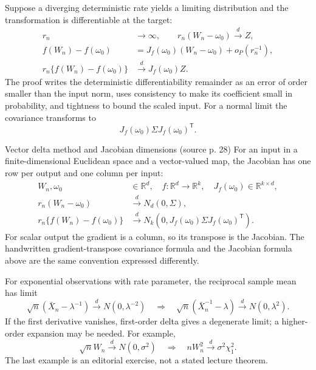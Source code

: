 \documentclass[12pt]{article}
\newcommand{\R}{\mathbb R}
\begin{document}
Suppose a diverging deterministic rate yields a limiting distribution and
the transformation is differentiable at the target:
\begin{align}
 r_n&\to\infty,\qquad r_n(W_n-\omega_0)\xrightarrow{d}Z,\\
 f(W_n)-f(\omega_0)&=J_f(\omega_0)(W_n-\omega_0)+o_P(r_n^{-1}),\\
 r_n\{f(W_n)-f(\omega_0)\}&\xrightarrow{d}J_f(\omega_0)Z.
\end{align}
The proof writes the deterministic differentiability remainder as an
error of order smaller than the input norm, uses consistency to make
its coefficient small in probability, and tightness to bound the scaled
input. For a normal limit the covariance transforms to
\begin{equation}
 J_f(\omega_0)\Sigma J_f(\omega_0)^{\mathsf T}.
\end{equation}
\begin{conceptbox}{Vector delta method and Jacobian dimensions (source p. 28)}
For an input in a finite-dimensional Euclidean space and a vector-valued
map, the Jacobian has one row per output and one column per input:
\begin{align}
 W_n,\omega_0&\in\R^d,\quad f:\R^d\to\R^k,
 \quad J_f(\omega_0)\in\R^{k\times d},\\
 r_n(W_n-\omega_0)&\xrightarrow{d}N_d(0,\Sigma),\\
 r_n\{f(W_n)-f(\omega_0)\}&\xrightarrow{d}
 N_k\!\left(0,J_f(\omega_0)\Sigma J_f(\omega_0)^{\mathsf T}\right).
\end{align}
For scalar output the gradient is a column, so its transpose is the
Jacobian. The handwritten gradient-transpose covariance formula and the
Jacobian formula above are the same convention expressed differently.
\end{conceptbox}
For exponential observations with rate parameter, the reciprocal sample
mean has limit
\begin{equation}
 \sqrt n(\bar X_n-\lambda^{-1})\xrightarrow{d}N(0,\lambda^{-2})
 \quad\Longrightarrow\quad
 \sqrt n(\bar X_n^{-1}-\lambda)\xrightarrow{d}N(0,\lambda^2).
\end{equation}
If the first derivative vanishes, first-order delta gives a degenerate
limit; a higher-order expansion may be needed. For example,
\begin{equation}
 \sqrt nW_n\xrightarrow{d}N(0,\sigma^2)
 \quad\Longrightarrow\quad nW_n^2\xrightarrow{d}\sigma^2\chi_1^2.
\end{equation}
The last example is an editorial exercise, not a stated lecture theorem.
\end{document}
